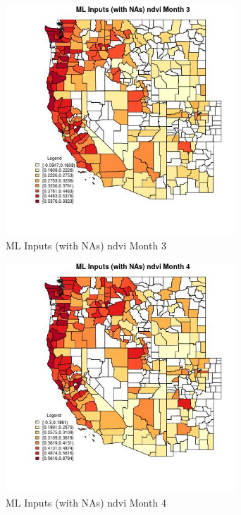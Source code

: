 \clearpage 

\begin{figure} 
\centering  
\includegraphics[width=0.77\textwidth]{Code_Outputs/Report_ML_input_PM25_Step4_part_e_de_duplicated_aves_compiled_2019-05-21wNAs_CountyndvimedianMonth3.jpg} 
\caption{\label{fig:Report_ML_input_PM25_Step4_part_e_de_duplicated_aves_compiled_2019-05-21wNAsCountyndvimedianMonth3}ML Inputs (with NAs) ndvi Month 3} 
\end{figure} 
 

\begin{figure} 
\centering  
\includegraphics[width=0.77\textwidth]{Code_Outputs/Report_ML_input_PM25_Step4_part_e_de_duplicated_aves_compiled_2019-05-21wNAs_CountyndvimedianMonth4.jpg} 
\caption{\label{fig:Report_ML_input_PM25_Step4_part_e_de_duplicated_aves_compiled_2019-05-21wNAsCountyndvimedianMonth4}ML Inputs (with NAs) ndvi Month 4} 
\end{figure} 
 

